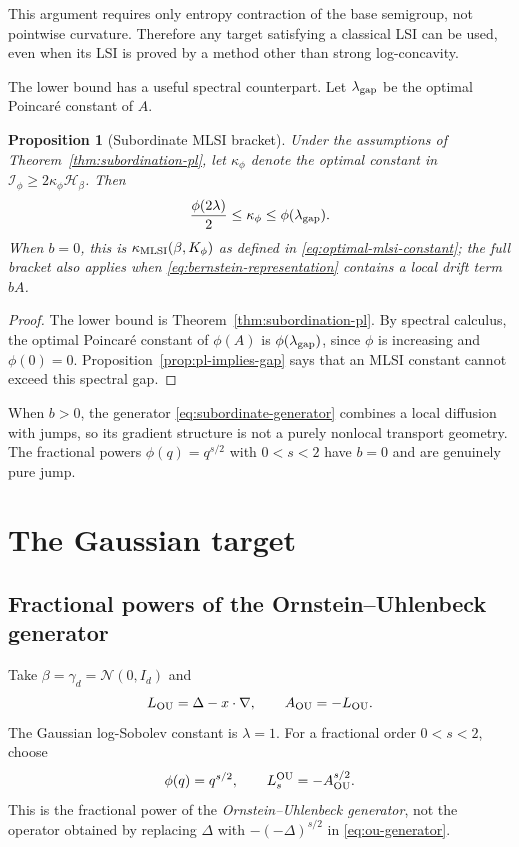 \documentclass[11pt]{article}
\newtheorem{proposition}[theorem]{Proposition}
\theoremstyle{definition}
\newcommand{\cI}{\mathcal I}
\newcommand{\cH}{\mathcal H}
\begin{document}
This argument requires only entropy contraction of the base semigroup, not
pointwise curvature.  Therefore any target satisfying a classical LSI can be
used, even when its LSI is proved by a method other than strong
log-concavity.

The lower bound has a useful spectral counterpart.  Let $\lambda_{\rm gap}$
be the optimal Poincar\'e constant of $A$.

\begin{proposition}[Subordinate MLSI bracket]
\label{prop:subordinate-mlsi-bracket}
Under the assumptions of Theorem~\ref{thm:subordination-pl}, let
$\kappa_\phi$ denote the optimal constant in
$\cI_\phi\geq2\kappa_\phi\cH_\beta$.  Then
\begin{equation}\label{eq:general-subordinate-bracket}
  \frac{\phi(2\lambda)}2
  \leq \kappa_\phi
  \leq \phi(\lambda_{\rm gap}).
\end{equation}
When $b=0$, this is $\kappa_{\rm MLSI}(\beta,K_\phi)$ as defined in
\eqref{eq:optimal-mlsi-constant}; the full bracket also applies when
\eqref{eq:bernstein-representation} contains a local drift term $bA$.
\end{proposition}

\begin{proof}
The lower bound is Theorem~\ref{thm:subordination-pl}.  By spectral calculus,
the optimal Poincar\'e constant of $\phi(A)$ is
$\phi(\lambda_{\rm gap})$, since $\phi$ is increasing and $\phi(0)=0$.
Proposition~\ref{prop:pl-implies-gap} says that an MLSI constant cannot
exceed this spectral gap.
\end{proof}

When $b>0$, the generator \eqref{eq:subordinate-generator} combines a local
diffusion with jumps, so its gradient structure is not a purely nonlocal
transport geometry.  The fractional powers $\phi(q)=q^{s/2}$ with
$0<s<2$ have $b=0$ and are genuinely pure jump.

\section{The Gaussian target}

\subsection{Fractional powers of the Ornstein--Uhlenbeck generator}

Take $\beta=\gamma_d=\mathcal N(0,I_d)$ and
\begin{equation}\label{eq:ou-generator}
  L_{\rm OU}=\Delta-x\cdot\nabla,
  \qquad A_{\rm OU}=-L_{\rm OU}.
\end{equation}
The Gaussian log-Sobolev constant is $\lambda=1$.  For a fractional order
$0<s<2$, choose
\begin{equation}\label{eq:fractional-ou-generator}
  \phi(q)=q^{s/2},
  \qquad
  L_s^{\rm OU}=-A_{\rm OU}^{s/2}.
\end{equation}
This is the fractional power of the \emph{Ornstein--Uhlenbeck generator},
not the operator obtained by replacing $\Delta$ with
$-(-\Delta)^{s/2}$ in \eqref{eq:ou-generator}.
\end{document}
